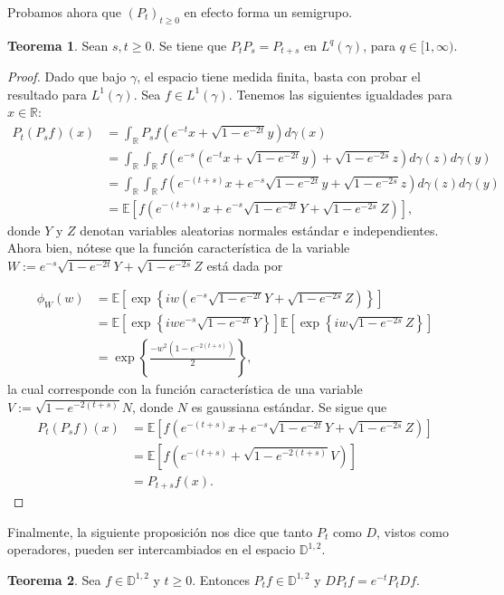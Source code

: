 \documentclass[letterpaper,twoside,12pt]{book}
\newcommand{\R}{\mathbb{R}}
\newcommand{\D}{\mathbb{D}}
\newcommand{\E}{\mathbb{E}}
\newcommand{\1}{\mathds{1}}
\theoremstyle{definition}
\theoremstyle{definition}
\newtheorem{teo}{Teorema}
\theoremstyle{remark}
\theoremstyle{definition}
\theoremstyle{definition}
\theoremstyle{definition}
\theoremstyle{definition}
\theoremstyle{definition}
\begin{document}
Probamos ahora que $(P_t)_{t\geq0}$ en efecto forma un semigrupo.
\begin{teo} 
Sean $s,t\geq0$. Se tiene que $P_tP_s=P_{t+s}$ en $L^q(\gamma)$, para $q\in [1,\infty)$.
\end{teo}
\begin{proof} 
  Dado que bajo $\gamma$, el espacio tiene medida finita, basta con probar el resultado para $L^1(\gamma)$. Sea $f\in L^1(\gamma)$. Tenemos las siguientes igualdades para $x\in \R$:
\begin{align*}
   P_{t}(P_sf)(x)&=\int_\R P_sf\left(e^{-t}x+\sqrt{1-e^{-2t}}y\right)d\gamma(x)\\
   &=\int_\R \int_\R f\left(e^{-s}(e^{-t}x+\sqrt{1-e^{-2t}}y)+\sqrt{1-e^{-2s}}z\right)d\gamma(z)d\gamma(y)\\
   &=\int_\R\int_\R f \left(e^{-(t+s)}x+e^{-s}\sqrt{1-e^{-2t}}y+\sqrt{1-e^{-2s}}z\right)d\gamma(z)d\gamma(y)\\
   &=\E\left[f \left(e^{-(t+s)}x+e^{-s}\sqrt{1-e^{-2t}}Y+\sqrt{1-e^{-2s}}Z\right)\right],
\end{align*}
donde $Y$ y $Z$ denotan variables aleatorias normales estándar e independientes. Ahora bien, nótese que la función característica de la variable $W:=e^{-s}\sqrt{1-e^{-2t}}Y+\sqrt{1-e^{-2s}}Z$ está dada por 

\begin{align*}
   \phi_W(w)&=\E\left[\exp \left\{iw(e^{-s}\sqrt{1-e^{-2t}}Y+\sqrt{1-e^{-2s}}Z)\right\}\right]\\
   &=\E\left[\exp \left\{iwe^{-s}\sqrt{1-e^{-2t}}Y\right\}\right]\E\left[\exp \left\{iw\sqrt{1-e^{-2s}}Z\right\}\right]\\
   &=\exp \left\{\frac{-w^2(1-e^{-2(t+s)})}{2}\right\},
\end{align*}
la cual corresponde con la función característica de una variable $V:=\sqrt{1-e^{-2(t+s)}}N$, donde $N$ es gaussiana estándar. Se sigue que 
\begin{align*}
   P_{t}(P_sf)(x)&=\E\left[f \left(e^{-(t+s)}x+e^{-s}\sqrt{1-e^{-2t}}Y+\sqrt{1-e^{-2s}}Z\right)\right]\\
   &=\E\left[f \left(e^{-(t+s)}+\sqrt{1-e^{-2(t+s)}}V\right)\right]\\
   &=P_{t+s}f(x).
\end{align*}
 \end{proof}
Finalmente, la siguiente proposición nos dice que tanto $P_t$ como $D$, vistos como operadores, pueden ser intercambiados en el espacio $\mathbb{D}^{1,2}$.
\begin{teo} 
 Sea $f\in \D^{1,2}$ y $t\geq0$. Entonces $P_tf\in \D^{1,2}$ y $DP_tf=e^{-t}P_tDf$.
 \end{teo}
\end{document}
